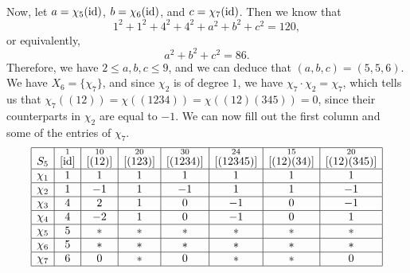 \begin{exmp}{}
\begin{align*}
    \end{align*}
    Now, let $a = \chi_5(\operatorname{id})$, $b = \chi_6(\operatorname{id})$, and $c = \chi_7(\operatorname{id})$. 
    Then we know that 
    \[ 1^2 + 1^2 + 4^2 + 4^2 + a^2 + b^2 + c^2 = 120, \] 
    or equivalently, 
    \[ a^2 + b^2 + c^2 = 86. \] 
    Therefore, we have $2 \leq a, b, c \leq 9$, and we can deduce that 
    $(a, b, c) = (5, 5, 6)$. We have $X_6 = \{\chi_7\}$, and since $\chi_2$ 
    is of degree $1$, we have $\chi_7 \cdot \chi_2 = \chi_7$, which tells us 
    that $\chi_7((12)) = \chi((1234)) = \chi((12)(345)) = 0$, since 
    their counterparts in $\chi_2$ are equal to $-1$. We can now fill out 
    the first column and some of the entries of $\chi_7$. 
    \begin{align*}
        \begin{array}{|c|c|c|c|c|c|c|c|}
            \hline
            S_5    & \overset{1}{[\operatorname{id}]} & \overset{10}{[(12)]} & \overset{20}{[(123)]} & \overset{30}{[(1234)]} & \overset{24}{[(12345)]} & \overset{15}{[(12)(34)]} & \overset{20}{[(12)(345)]} \\ \hline
            \chi_1 & 1                  & 1                    & 1                     & 1                      & 1                       & 1                        & 1                         \\ \hline
            \chi_2 & 1                  & -1                   & 1                     & -1                     & 1                       & 1                        & -1                        \\ \hline
            \chi_3 & 4                  & 2                    & 1                     & 0                      & -1                      & 0                        & -1                        \\ \hline
            \chi_4 & 4                  & -2                   & 1                     & 0                      & -1                      & 0                        & 1                         \\ \hline
            \chi_5 & 5                  & *                    & *                     & *                      & *                       & *                        & *                         \\ \hline
            \chi_6 & 5                  & *                    & *                     & *                      & *                       & *                        & *                         \\ \hline
            \chi_7 & 6                  & 0                    & *                     & 0                      & *                       & *                        & 0                         \\ \hline

\end{array}
\end{align*}
\end{exmp}
